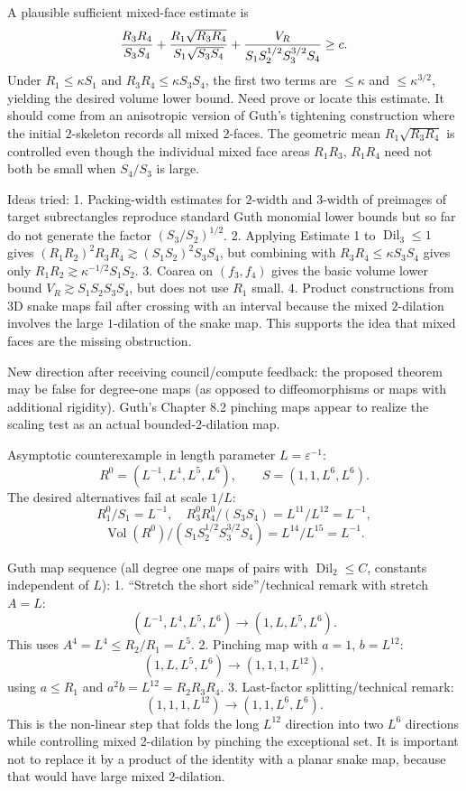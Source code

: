 \documentclass[12pt]{article}
\newcommand{\Dil}{\operatorname{Dil}}
\begin{document}
A plausible sufficient mixed-face estimate is
\[
 {R_3R_4\over S_3S_4}
 +{R_1\sqrt{R_3R_4}\over S_1\sqrt{S_3S_4}}
 +{V_R\over S_1S_2^{1/2}S_3^{3/2}S_4}\ge c.
\]
Under \(R_1\le\kappa S_1\) and \(R_3R_4\le\kappa S_3S_4\), the first two
terms are \(\le\kappa\) and \(\le\kappa^{3/2}\), yielding the desired
volume lower bound.  Need prove or locate this estimate.  It should come
from an anisotropic version of Guth's tightening construction where the
initial \(2\)-skeleton records all mixed \(2\)-faces.  The geometric mean
\(R_1\sqrt{R_3R_4}\) is controlled even though the individual mixed face
areas \(R_1R_3\), \(R_1R_4\) need not both be small when \(S_4/S_3\) is
large.

Ideas tried:
1. Packing-width estimates for \(2\)-width and \(3\)-width of preimages of
target subrectangles reproduce standard Guth monomial lower bounds but so
far do not generate the factor \((S_3/S_2)^{1/2}\).
2. Applying Estimate 1 to \(\Dil_3\le1\) gives
\((R_1R_2)^2R_3R_4\gtrsim(S_1S_2)^2S_3S_4\), but combining with
\(R_3R_4\le\kappa S_3S_4\) gives only \(R_1R_2\gtrsim\kappa^{-1/2}S_1S_2\).
3. Coarea on \((f_3,f_4)\) gives the basic volume lower bound
\(V_R\gtrsim S_1S_2S_3S_4\), but does not use \(R_1\) small.
4. Product constructions from 3D snake maps fail after crossing with an
interval because the mixed \(2\)-dilation involves the large \(1\)-dilation
of the snake map.  This supports the idea that mixed faces are the missing
obstruction.



New direction after receiving council/compute feedback: the proposed theorem may be
false for degree-one maps (as opposed to diffeomorphisms or maps with additional
rigidity).  Guth's Chapter 8.2 pinching maps appear to realize the scaling test as an
actual bounded-2-dilation map.

Asymptotic counterexample in length parameter \(L=\varepsilon^{-1}\):
\[
 R^0=(L^{-1},L^4,L^5,L^6),\qquad S=(1,1,L^6,L^6).
\]
The desired alternatives fail at scale \(1/L\):
\[
 R_1^0/S_1=L^{-1},\quad
 R_3^0R_4^0/(S_3S_4)=L^{11}/L^{12}=L^{-1},
\]
\[
 \operatorname{Vol}(R^0)/(S_1S_2^{1/2}S_3^{3/2}S_4)=L^{14}/L^{15}=L^{-1}.
\]

Guth map sequence (all degree one maps of pairs with \(\Dil_2\le C\), constants
independent of \(L\)):
1. ``Stretch the short side''/technical remark with stretch \(A=L\):
\[
(L^{-1},L^4,L^5,L^6)\to (1,L,L^5,L^6).
\]
This uses \(A^4=L^4\le R_2/R_1=L^5\).
2. Pinching map with \(a=1\), \(b=L^{12}\):
\[
(1,L,L^5,L^6)\to(1,1,1,L^{12}),
\]
using \(a\le R_1\) and \(a^2b=L^{12}=R_2R_3R_4\).
3. Last-factor splitting/technical remark:
\[
(1,1,1,L^{12})\to(1,1,L^6,L^6).
\]
This is the non-linear step that folds the long \(L^{12}\) direction into two
\(L^6\) directions while controlling mixed 2-dilation by pinching the exceptional
set.  It is important not to replace it by a product of the identity with a planar
snake map, because that would have large mixed \(2\)-dilation.
\end{document}
